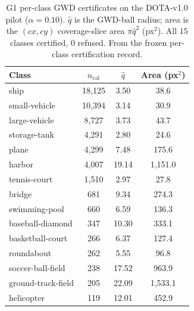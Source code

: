 \documentclass[11pt]{article}
\begin{document}
\begin{table}[t]\centering\small
\caption{G1 per-class GWD certificates on the DOTA-v1.0 pilot ($\alpha=0.10$). $\hat q$ is the GWD-ball
radius; area is the $(cx,cy)$ coverage-slice area $\pi\hat q^2$ (px$^2$). All $15$ classes certified, $0$
refused. From the frozen per-class certification record.}\label{tab:g1mondrian}
\begin{tabular}{lccc}
\toprule
Class & $n_{\mathrm{cal}}$ & $\hat q$ & Area (px$^2$) \\
\midrule
ship               & 18{,}125 & 3.50 & 38.6 \\
small-vehicle      & 10{,}394 & 3.14 & 30.9 \\
large-vehicle      & 8{,}727  & 3.73 & 43.7 \\
storage-tank       & 4{,}291  & 2.80 & 24.6 \\
plane              & 4{,}299  & 7.48 & 175.6 \\
harbor             & 4{,}007  & 19.14 & 1{,}151.0 \\
tennis-court       & 1{,}510  & 2.97 & 27.8 \\
bridge             & 681      & 9.34 & 274.3 \\
swimming-pool      & 660      & 6.59 & 136.3 \\
baseball-diamond   & 347      & 10.30 & 333.1 \\
basketball-court   & 266      & 6.37 & 127.4 \\
roundabout         & 262      & 5.55 & 96.8 \\
soccer-ball-field  & 238      & 17.52 & 963.9 \\
ground-track-field & 205      & 22.09 & 1{,}533.1 \\
helicopter         & 119      & 12.01 & 452.9 \\
\bottomrule
\end{tabular}
\end{table}
\end{document}
